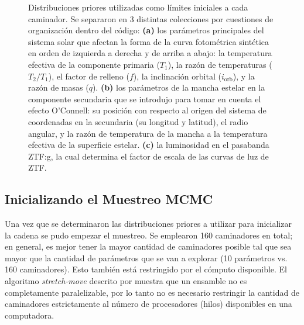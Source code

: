 \begin{figure}[!ht]
	\centering
	\caption{Distribuciones priores utilizadas como límites iniciales a cada
	caminador. Se separaron en 3 distintas colecciones por cuestiones de
	organización dentro del código: \textbf{(a)} los parámetros principales del
	sistema solar que afectan la forma de la curva fotométrica sintética en
	orden de izquierda a derecha y de arriba a abajo: la temperatura efectiva de
	la componente primaria ($T_{1}$), la razón de temperaturas ($T_2/T_1$), el
	factor de relleno ($f$), la inclinación orbital ($i_{\mathrm{orb}}$), y la
	razón de masas ($q$). \textbf{(b)} los parámetros de la mancha estelar en la
	componente secundaria que se introdujo para tomar en cuenta el efecto
	O'Connell: su posición con respecto al origen del sistema de coordenadas en
	la secundaria (su longitud y latitud), el radio angular, y la
	razón de temperatura de la mancha a la temperatura efectiva
	de la superficie estelar. \textbf{(c)} la
	luminosidad en el pasabanda ZTF:g, la cual determina el factor de escala de
	las curvas de luz de ZTF.}
	\label{figuraColeccionesPrioresZtf}
\end{figure}

\newpage
\clearpage

\subsection{Inicializando el Muestreo MCMC}

Una vez que se determinaron las distribuciones priores a utilizar para
inicializar la cadena se pudo empezar el muestreo. Se emplearon 160 caminadores
en total; en general, es mejor tener la mayor cantidad de caminadores posible
tal que sea mayor que la cantidad de parámetros que se van a explorar (10
parámetros vs. 160 caminadores). Esto también está restringido por el cómputo
disponible. El algoritmo \textit{stretch-move} descrito por
 muestra que un ensamble no es
completamente paralelizable, por lo tanto no es necesario restringir la cantidad
de caminadores estrictamente al número de procesadores (hilos) disponibles en
una computadora. 

